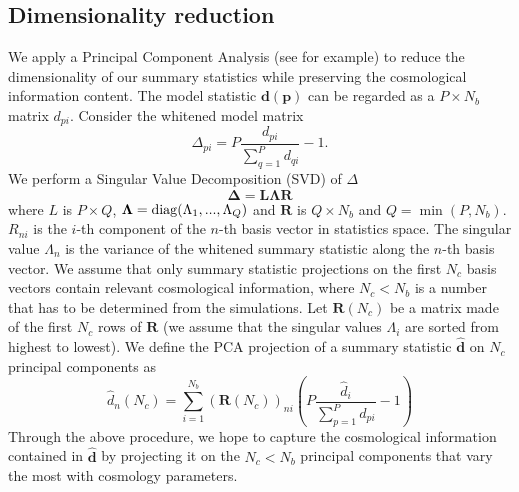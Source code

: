 \documentclass[reprint,aps,prd,superscriptaddress,showkeys,showpacs]{revtex4-1}
\newcommand{\bb}[1]{\mathbf{#1}}
\newcommand{\bbh}[1]{\mathbf{\hat{#1}}}
\newcommand{\h}[1]{\hat{#1}}
\begin{document}

\subsection{Dimensionality reduction}
We apply a Principal Component Analysis (see \citep{astroMLText} for example) to reduce the dimensionality of our summary statistics while preserving the cosmological information content. The model statistic $\bb{d}(\bb{p})$ can be regarded as a $P\times N_b$ matrix $d_{pi}$. Consider the whitened model matrix
\begin{equation}
\label{meth:whitening}
\Delta_{pi} = P\frac{d_{pi}}{\sum_{q=1}^Pd_{qi}} - 1.
\end{equation} 
%
We perform a Singular Value Decomposition (SVD) of $\Delta$ 
\begin{equation}
\bb\Delta = \bb{L}\bb{\Lambda} \bb{R}
\end{equation}
%
where $L$ is $P\times Q$, $\bb{\Lambda}={\rm diag}(\Lambda_1,...,\Lambda_Q)$ and $\bb{R}$ is $Q\times N_b$ and $Q={\min}(P,N_b)$. $R_{ni}$ is the $i$-th component of the $n$-th basis vector in statistics space. The singular value $\Lambda_n$ is the variance of the whitened summary statistic along the $n$-th basis vector. We assume that only summary statistic projections on the first $N_c$ basis vectors contain relevant cosmological information, where $N_c<N_b$ is a number that has to be determined from the simulations. Let $\bb{R}(N_c)$ be a matrix made of the first $N_c$ rows of $\bb{R}$ (we assume that the singular values $\Lambda_i$ are sorted from highest to lowest). We define the PCA projection of a summary statistic $\bbh{d}$ on $N_c$ principal components as 
\begin{equation}
\label{meth:pcaprojection}
\h{d}_n(N_c) = \sum_{i=1}^{N_b}(\bb{R}(N_c))_{ni}\left(P\frac{\h{d}_i}{\sum_{p=1}^P d_{pi}}-1\right) 
\end{equation} 
%
Through the above procedure, we hope to capture the cosmological information contained in $\bbh{d}$ by projecting it on the $N_c<N_b$ principal components that vary the most with cosmology parameters.  

\end{document}
